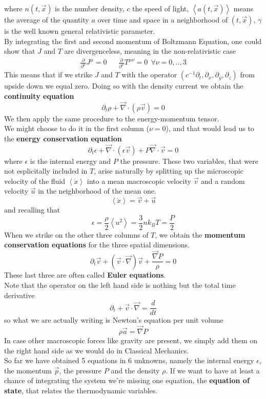 \documentclass[11pt]{article}
\numberwithin{equation}{section}
\begin{document}
where $n(t, \vec{x})$ is the number density, $c$ the speed of light,  $\left< a(t,\vec{x}) \right>$ means the average of the quantity $a$ over time and space in a neighborhood of $(t, \vec{x})$, $\gamma$ is the well known general relativistic parameter.\\
By integrating the first and second momentum of Boltzmann Equation, one could show that $J$ and $T$ are divergenceless, meaning in the non-relativistic case
\begin{align}
\frac{\partial }{\partial^{\mu}}J^{\mu}=0 && \frac{\partial }{\partial^{\mu}}T^{\mu \nu}=0 \  \  \forall \nu =0,..,3 
\end{align}
This means that if we strike $J$ and $T$ with the operator $(c^{-1}\partial_t,\partial_x,\partial_y,\partial_z)$ from upside down we equal zero. Doing so with the density current we obtain the \textbf{continuity equation}
\begin{equation} \label{cont}
\partial_t \rho + \vec\nabla \cdot (\rho \vec{v})=0
\end{equation}
We then apply the same procedure to the energy-momentum tensor.\\
We might choose to do it in the first column ($\nu=0$), and that would lead us to the \textbf{energy conservation equation}
\begin{equation} \label{consen}
\partial_t \epsilon + \vec \nabla \cdot (\epsilon \vec{v}) + P\vec \nabla \cdot \vec{v}=0
\end{equation}
where $\epsilon$ is the internal energy and $P$ the pressure. These two variables, that were not esplicitally included in $T$, arise naturally by splitting up the microscopic velocity of the fluid $\left <  \dot{x} \right >$ into a mean macroscopic velocity $\vec{v}$ and a random velocity $\vec{u}$ in the neighborhood of the mean one. 
$$\left <  \dot{x} \right >= \vec{v}  +  \vec{u} $$
and recalling that 
$$\epsilon = \frac{\rho}{2} \left <  u^2 \right > = \frac{3}{2} n k_B T= \frac{P}{2}$$
When we strike on the other three columns of $T$, we obtain the \textbf{momentum conservation equations} for the three spatial dimensions.
\begin{equation} \label{euler}
\partial_t \vec{v} + (\vec{v} \cdot \vec \nabla) \vec{v} + \frac{\vec \nabla P}{\rho}=0
\end{equation}
These last three are often called \textbf{Euler equations}. \\
Note that the operator on the left hand side is nothing but the total time derivative
$$
\partial_t + \vec{v} \cdot \vec \nabla = \frac{d}{dt}
$$
so what we are actually writing is Newton's equation per unit volume
$$
\rho \vec{a} = \vec \nabla P
$$
In case other macroscopic forces like gravity are present, we simply add them on the right hand side as we would do in Classical Mechanics. \\
So far we have obtained 5 equations in 6 unknowns, namely the internal energy $\epsilon$, the momentum $\vec{p}$, the pressure $P$ and the density $\rho$. If we want to have at least a chance of integrating the system we're missing one equation, the \textbf{equation of state}, that relates the thermodynamic variables.
\end{document}

